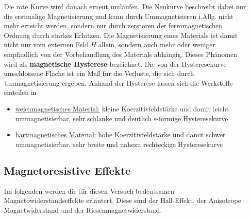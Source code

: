 \documentclass[german,  %
parskip=full,  %
]{scrartcl}
\begin{document}
Die rote Kurve wird danach erneut umlaufen. Die Neukurve beschreibt dabei nur die erstmalige Magnetisierung und kann durch Ummagnetisieren i.Allg. nicht mehr erreicht werden, sondern nur durch zerstören der ferromagnetischen Ordnung durch starkes Erhitzen. Die Magnetisierung eines Materials ist damit nicht nur vom externen Feld \(H\) allein, sondern auch mehr oder weniger empfindlich von der Vorbehandlung des Materials abhängig. Dieses Phänomen wird als \textbf{magnetische Hysterese} bezeichnet. Die von der Hysteresekurve umschlossene Fläche ist ein Maß für die Verluste, die sich durch Ummagnetisierung ergeben. Anhand der Hysterese lassen sich die Werkstoffe einteilen in
\begin{itemize}
\item \underline{weichmagnetisches Material:} kleine Koerzitivfeldstärke und damit leicht ummagnetisierbar, sehr schlanke und deutlich s-förmige Hysteresekurve
\item \underline{hartmagnetisches Material:} hohe Koerzitivfeldstärke und damit schwer ummagnetisierbar, sehr breite und nahezu rechteckige Hysteresekurve
\end{itemize}
\subsection{Magnetoresistive Effekte}
Im folgenden werden die für diesen Versuch bedeutsamen Magnetowiderstandseffekte erläutert. Diese sind der Hall-Effekt, der Anisotrope Magnetwiderstand und der Riesenmagnetwiderstand.
\end{document}
